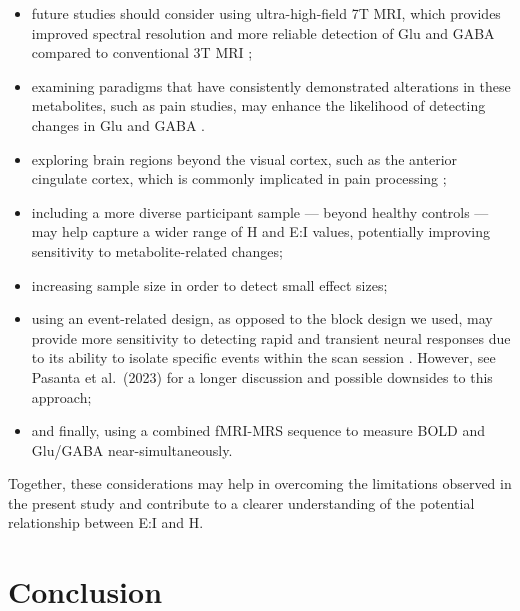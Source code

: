 \documentclass[
true
]{sn-jnl}
\providecommand{\tightlist}{%
  \setlength{\itemsep}{0pt}\setlength{\parskip}{0pt}}
\begin{document}
\begin{itemize}
\tightlist
\item
  future studies should consider using ultra-high-field 7T MRI, which
  provides improved spectral resolution and more reliable detection of
  Glu and GABA compared to conventional 3T MRI
  \citep{terpstraTestretestReproducibilityNeurochemical2016};
\item
  examining paradigms that have consistently demonstrated alterations in
  these metabolites, such as pain studies, may enhance the likelihood of
  detecting changes in Glu and GABA
  \citep{archibaldMetaboliteActivityAnterior2020, cleveAssessmentIntraInterregional2017, gutzeitDifferentialNMRSpectroscopy2013}.
\item
  exploring brain regions beyond the visual cortex, such as the anterior
  cingulate cortex, which is commonly implicated in pain processing
  \citep{archibaldMetaboliteActivityAnterior2020, mullinsNovelTechniqueStudy2005, gussewTimeresolvedFunctional1H2010, gutzeitInsulaspecificResponsesInduced2011};
\item
  including a more diverse participant sample --- beyond healthy
  controls --- may help capture a wider range of H and E:I values,
  potentially improving sensitivity to metabolite-related changes;
\item
  increasing sample size in order to detect small effect sizes;
\item
  using an event-related design, as opposed to the block design we used,
  may provide more sensitivity to detecting rapid and transient neural
  responses due to its ability to isolate specific events within the
  scan session \citep{mullinsTheoryFunctionalMagnetic2018}. However, see
  Pasanta et al.~(2023) \citep{pasantaFunctionalMRSStudies2023} for a
  longer discussion and possible downsides to this approach;
\item
  and finally, using a combined fMRI-MRS sequence
  \citep{ipCombinedFMRIMRSAcquires2017, dwyerSimultaneousMeasurementBOLD2021}
  to measure BOLD and Glu/GABA near-simultaneously.
\end{itemize}

Together, these considerations may help in overcoming the limitations
observed in the present study and contribute to a clearer understanding
of the potential relationship between E:I and H.

\section{Conclusion}\label{conclusion}
\end{document}
